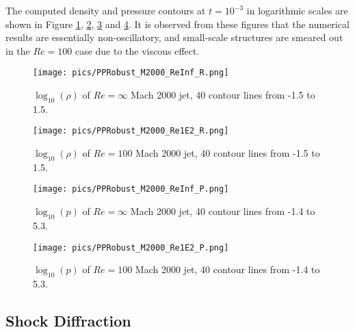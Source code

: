 The computed density and pressure contours at $t=10^{-3}$ in logarithmic scales are shown in Figure \ref{fig:M2000_ReInf_R}, \ref{fig:M2000_Re1E2_R}, \ref{fig:M2000_ReInf_P} and \ref{fig:M2000_Re1E2_P}.
It is observed from these figures that the numerical results are essentially non-oscillatory, and small-scale structures are smeared out in the $Re=100$ case due to the viscous effect.

\begin{figure}[htbp]
    \centering
    \texttt{[image: pics/PPRobust\_M2000\_ReInf\_R.png]}
    \caption{$\log_{10}(\rho)$ of $Re=\infty$ Mach 2000 jet, 40 contour lines from -1.5 to 1.5.}
    \label{fig:M2000_ReInf_R}
\end{figure}

\begin{figure}[htbp]
	\centering
	\texttt{[image: pics/PPRobust\_M2000\_Re1E2\_R.png]}
	\caption{$\log_{10}(\rho)$ of $Re=100$ Mach 2000 jet, 40 contour lines from -1.5 to 1.5.}
	\label{fig:M2000_Re1E2_R}
\end{figure}

\begin{figure}[htbp]
	\centering
	\texttt{[image: pics/PPRobust\_M2000\_ReInf\_P.png]}
	\caption{$\log_{10}(p)$ of $Re=\infty$ Mach 2000 jet, 40 contour lines from -1.4 to 5.3.}
	\label{fig:M2000_ReInf_P}
\end{figure}

\begin{figure}[htbp]
    \centering
    \texttt{[image: pics/PPRobust\_M2000\_Re1E2\_P.png]}
    \caption{$\log_{10}(p)$ of $Re=100$ Mach 2000 jet, 40 contour lines from -1.4 to 5.3.}
    \label{fig:M2000_Re1E2_P}
\end{figure}

\subsection{Shock Diffraction}

